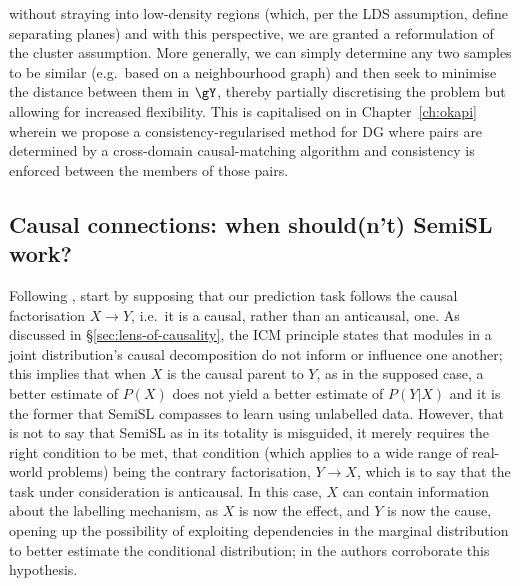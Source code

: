  \) without straying into low-density regions (which, per the LDS assumption, define separating
 planes) and with this perspective, we are granted a reformulation of the cluster assumption.
 More generally, we can simply determine any two samples to be similar (e.g.\ based on a
 neighbourhood graph) and then seek to minimise the distance between them in \( \gY \), thereby
 partially discretising the problem but allowing for increased flexibility.
 This is capitalised on in Chapter~\ref{ch:okapi} wherein we propose a consistency-regularised
 method for \ac{DG} where pairs are determined by a cross-domain causal-matching algorithm and
 consistency is enforced between the members of those pairs.
 \subsection{Causal connections: when should(n't) \acl{SemiSL} work?}\label{ssec:semisl-causality}
Following \citet{scholkopf2021toward}, start by supposing that our prediction task follows the
causal factorisation \( X \to Y\), i.e.\ it is a causal, rather than an anticausal, one.
%
As discussed in \S\ref{sec:lens-of-causality}, the ICM principle states that modules in a joint
distribution's causal decomposition do not inform or influence one another; this implies that when
\(X\) is the causal parent to \(Y\), as in the supposed case, a better estimate of \(P(X)\) does
not yield a better estimate of \(P(Y|X)\) and it is the former that \ac{SemiSL} compasses to learn
using unlabelled data.
%
However, that is not to say that \ac{SemiSL} as in its totality is misguided, it merely requires the
right condition to be met, that condition (which applies to a wide range of real-world problems)
being the contrary factorisation, \(Y \to X \), which is to say that the task under
consideration is anticausal.
%
In this case, \(X\) can contain information about the labelling mechanism, as \(X\) is now the
effect, and \(Y\) is now the cause, opening up the possibility of exploiting dependencies in the
marginal distribution to better estimate the conditional distribution; in
\citet{scholkopf2012causal} the authors corroborate this hypothesis.
%
 
